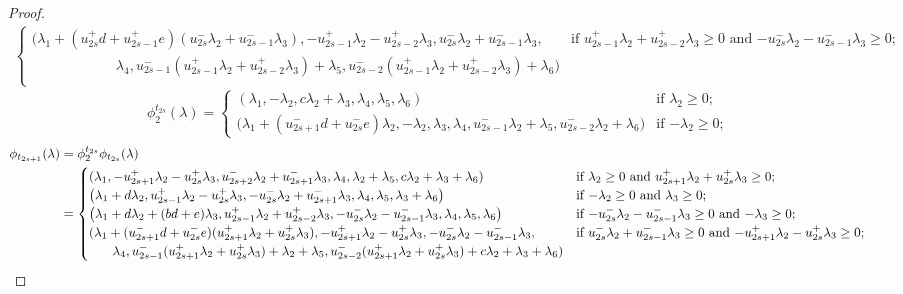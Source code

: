 \documentclass{amsart}
\numberwithin{theorem}{section}
\begin{document}
\begin{landscape}
\begin{proof}
\begin{align*}
\begin{cases}
        (\lambda_1+(u_{2s}^+d+u_{2s-1}^+e)(u_{2s}^-\lambda_2+u_{2s-1}^-\lambda_3),-u_{2s-1}^+\lambda_2-u_{2s-2}^+\lambda_3,u_{2s}^-\lambda_2+u_{2s-1}^-\lambda_3, & \text{if $u_{2s-1}^+\lambda_2+u_{2s-2}^+\lambda_3 \ge 0$ and $-u_{2s}^-\lambda_2-u_{2s-1}^-\lambda_3 \ge 0$;}\\
        \hspace{1in} \lambda_4,u_{2s-1}^-(u_{2s-1}^+\lambda_2+u_{2s-2}^+\lambda_3)+\lambda_5,u_{2s-2}^-(u_{2s-1}^+\lambda_2+u_{2s-2}^+\lambda_3)+\lambda_6) & \\
      \end{cases}
    \end{align*}
    \[
      \phi^{t_{2s}}_2(\lambda)
      =
      \begin{cases} 
        (\lambda_1,-\lambda_2,c\lambda_2+\lambda_3,\lambda_4,\lambda_5,\lambda_6) & \text{if $\lambda_2 \ge 0$;}\\
        \big(\lambda_1+(u_{2s+1}^-d+u_{2s}^-e)\lambda_2,-\lambda_2,\lambda_3,\lambda_4,u_{2s-1}^-\lambda_2+\lambda_5,u_{2s-2}^-\lambda_2+\lambda_6\big) & \text{if $-\lambda_2 \ge 0$;}
      \end{cases}
    \]
    \begin{align*}
      \phi_{t_{2s+1}}(\lambda)
      &=\phi^{t_{2s}}_2\phi_{t_{2s}}(\lambda)\\
      &=
      \begin{cases} 
        (\lambda_1,-u_{2s+1}^+\lambda_2-u_{2s}^+\lambda_3,u_{2s+2}^-\lambda_2+u_{2s+1}^-\lambda_3,\lambda_4,\lambda_2+\lambda_5,c\lambda_2+\lambda_3+\lambda_6) & \text{if $\lambda_2 \ge 0$ and $u_{2s+1}^+\lambda_2+u_{2s}^+\lambda_3 \ge 0$;}\\
        \big(\lambda_1+d\lambda_2,u_{2s-1}^+\lambda_2-u_{2s}^+\lambda_3,-u_{2s}^-\lambda_2+u_{2s+1}^-\lambda_3,\lambda_4,\lambda_5,\lambda_3+\lambda_6\big) & \text{if $-\lambda_2 \ge 0$ and $\lambda_3 \ge 0$;}\\
        \big(\lambda_1+d\lambda_2+(bd+e)\lambda_3,u_{2s-1}^+\lambda_2+u_{2s-2}^+\lambda_3,-u_{2s}^-\lambda_2-u_{2s-1}^-\lambda_3,\lambda_4,\lambda_5,\lambda_6\big) & \text{if $-u_{2s}^-\lambda_2-u_{2s-1}^-\lambda_3 \ge 0$ and $-\lambda_3 \ge 0$;}\\
        (\lambda_1+(u_{2s+1}^-d+u_{2s}^-e)(u_{2s+1}^+\lambda_2+u_{2s}^+\lambda_3),-u_{2s+1}^+\lambda_2-u_{2s}^+\lambda_3,-u_{2s}^-\lambda_2-u_{2s-1}^-\lambda_3, & \text{if $u_{2s}^-\lambda_2+u_{2s-1}^-\lambda_3 \ge 0$ and $-u_{2s+1}^+\lambda_2-u_{2s}^+\lambda_3 \ge 0$;}\\
        \hspace{0.25in} \lambda_4,u_{2s-1}^-(u_{2s+1}^+\lambda_2+u_{2s}^+\lambda_3)+\lambda_2+\lambda_5,u_{2s-2}^-(u_{2s+1}^+\lambda_2+u_{2s}^+\lambda_3)+c\lambda_2+\lambda_3+\lambda_6) & \\
      \end{cases}
    \end{align*}
  \end{proof}
  \end{landscape}
\end{document}

